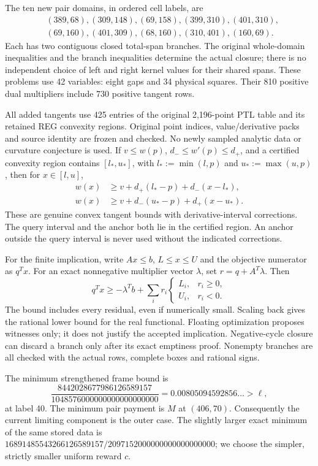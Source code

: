 \documentclass[11pt,a4paper]{article}
\begin{document}
The ten new pair domains, in ordered cell labels, are
\[
\begin{split}
 &(389,68),(309,148),(69,158),(399,310),(401,310),\\
 &(69,160),(401,309),(68,160),(310,401),(160,69).
\end{split}
\]
Each has two contiguous closed total-span branches. The original
whole-domain inequalities and the branch inequalities determine
the actual closure; there is no independent choice of left and
right kernel values for their shared spans. These problems use 42
variables: eight gaps and 34 physical squares. Their 810 positive
dual multipliers include 730 positive tangent rows.

All added tangents use 425 entries of the original 2,196-point PTL
table and its retained REG convexity regions. Original point indices,
value/derivative packs and source identity are frozen and checked.
No newly sampled analytic data or curvature conjecture is used.
If $v\le w(p)$, $d_-\le w'(p)\le d_+$, and a certified convexity
region contains $[l_*,u_*]$, with
$l_*:=\min(l,p)$ and $u_*:=\max(u,p)$, then for $x\in[l,u]$,
\[
\begin{split}
w(x)&\ge v+d_+(l_*-p)+d_-(x-l_*),\\
w(x)&\ge v+d_-(u_*-p)+d_+(x-u_*).
\end{split}
\]
These are genuine convex tangent bounds with derivative-interval
corrections. The query interval and the anchor both lie in the
certified region. An anchor outside the query interval is never
used without the indicated corrections.

For the finite implication, write $Ax\le b$, $L\le x\le U$ and
the objective numerator as $q^Tx$. For an exact nonnegative
multiplier vector $\lambda$, set $r=q+A^T\lambda$. Then
\[
 q^Tx\ge-\lambda^Tb+
 \sum_i r_i\begin{cases}L_i,&r_i\ge0,\\U_i,&r_i<0.\end{cases}
\]
The bound includes every residual, even if numerically small.
Scaling back gives the rational lower bound for the real functional.
Floating optimization proposes witnesses only; it does not justify
the accepted implication. Negative-cycle closure can discard a
branch only after its exact emptiness proof. Nonempty branches are
all checked with the actual rows, complete boxes and rational signs.

The minimum strengthened frame bound is
\[
 \frac{8442028677986126589157}{1048576000000000000000000}
 =0.00805094592856\ldots>\ell,
\]
at label 40. The minimum pair payment is $M$ at $(406,70)$.
Consequently the current limiting component is the outer case.
The slightly larger exact minimum of the same stored data is
$16891485543266126589157/2097152000000000000000000$;
we choose the simpler, strictly smaller uniform reward $c$.
\end{document}
